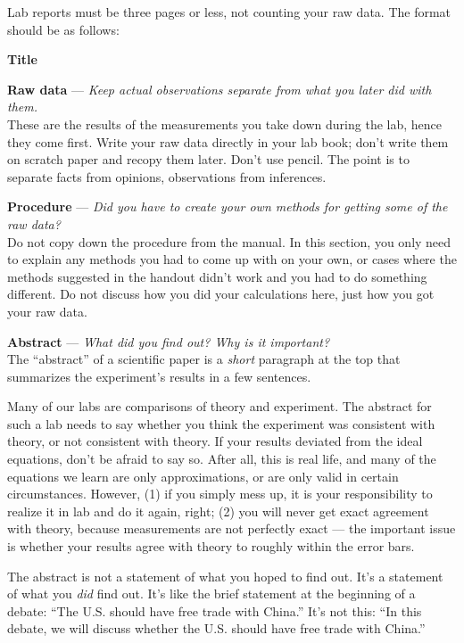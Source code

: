 
	Lab reports must be three pages or less, not counting your
raw data. The format should be as follows: 
\label{format-really-here}

\textbf{Title}

\textbf{Raw data} --- \emph{Keep actual observations separate from what you
later did with them.}\\
These are the results of the measurements you take down
during the lab, hence they come first. Write your raw data directly in your
lab book; don't write them on scratch paper and recopy them
later. Don't use pencil. The point is to separate facts from
opinions, observations from inferences.

\textbf{Procedure} --- \emph{Did you have to create your own methods for
getting some of the raw data?}\\
Do not copy down the procedure from the manual. In this
section, you only need to explain any methods you had to
come up with on your own, or cases where the methods
suggested in the handout didn't work and you had to do
something different. Do not discuss how you did your
calculations here, just how you got your raw data.

\textbf{Abstract} --- \emph{What did you find out? Why is it important?}\\
The ``abstract'' of a scientific paper is a \emph{short} paragraph
at the top that summarizes the experiment's results in a few
sentences. 

Many of our labs are comparisons of theory and experiment. The abstract
for such a lab needs to say whether you think the experiment was consistent
with theory, or not consistent with theory.
If your results deviated from the ideal equations, don't be afraid
to say so.
After all, this is real life, and many of the equations we
learn are only approximations, or are only valid in certain
circumstances. However, (1) if you simply mess up, it is
your responsibility to realize it in lab and do it again,
right; (2) you will never get exact agreement with theory,
because measurements are not perfectly exact --- the
important issue is whether your results agree with theory to
roughly within the error bars.

The abstract is not a statement of what you hoped to find out. It's
a statement of what you \emph{did} find out. It's like the brief statement
at the beginning of a debate: ``The U.S. should have free trade with China.''
It's not this: ``In this debate, we will discuss whether the U.S. should have
free trade with China.''

